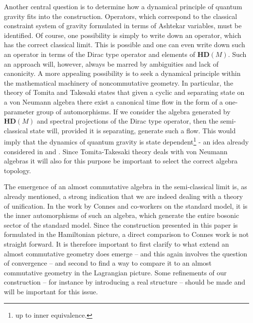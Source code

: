 \documentclass[12pt]{article}
\begin{document}
Another central question is to determine how a dynamical principle of quantum gravity fits into the construction. Operators, which correspond to the classical constraint system of gravity formulated in terms of Ashtekar variables, must be identified. Of course, one possibility is simply to write down an operator, which has the correct classical limit. This is possible and one can even write down such an operator in terms of the Dirac type operator and elements of $\mathbf{HD}(M) $. Such an approach will, however, always be marred by ambiguities and lack of canonicity. A more appealing possibility is to seek a dynamical principle within the mathematical machinery of noncommutative geometry. In particular, the theory of Tomita and Takesaki states that given a cyclic and separating state on a von Neumann algebra there exist a canonical time flow in the form of a one-parameter group of automorphisms. If we consider the algebra generated by $\mathbf{HD}(M) $ and spectral projections of the Dirac type operator, then the semi-classical state will, provided it is separating, generate such a flow. This would imply that the dynamics of quantum gravity is state dependent\footnote{up to inner equivalence.} - an idea already considered in \cite{Connes:1994hv} and \cite{Bertozzini:2010us}. Since Tomita-Takesaki theory deals with von Neumann algebras it will also for this purpose be important to select the correct algebra topology.




The emergence of an almost commutative algebra in the semi-classical limit is, as already mentioned, a strong indication that we are indeed dealing with a theory of unification. In the work by Connes and co-workers on the standard model, it is the inner automorphisms of such an algebra, which generate the entire bosonic sector of the standard model. Since the construction presented in this paper is formulated in the Hamiltonian picture, a direct comparison to Connes work is not straight forward. It is therefore important to first clarify to what extend an almost commutative geometry does emerge -- and this again involves the question of convergence -- and second to find a way to compare it to an almost commutative geometry in the Lagrangian picture. Some refinements of our construction -- for instance by introducing a real structure -- should be made and will be important for this issue.


\end{document}

